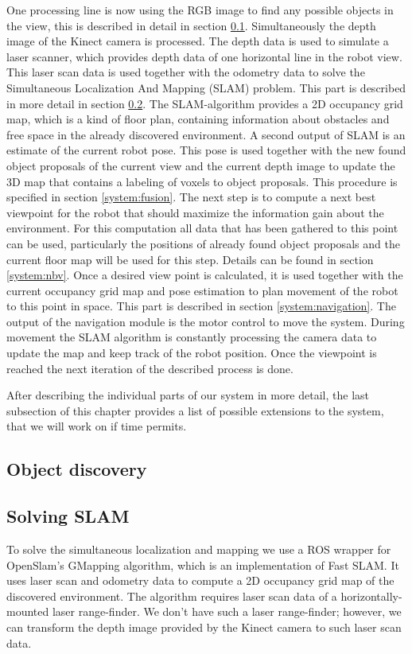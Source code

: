 \documentclass[a4paper,11pt,english]{article}
\begin{document}
One processing line is now using the RGB image to find any possible objects in the view, this is described in detail in section \ref{system:obj_discovery}.
Simultaneously the depth image of the Kinect camera is processed.
The depth data is used to simulate a laser scanner, which provides depth data of one horizontal line in the robot view. 
This laser scan data is used together with the odometry data to solve the Simultaneous Localization And Mapping (SLAM) problem. This part is described in more detail in section \ref{system:slam}.
The SLAM-algorithm provides a 2D occupancy grid map, which is a kind of floor plan, containing information about obstacles and free space in the already discovered environment. A second output of SLAM is an estimate of the current robot pose.
This pose is used together with the new found object proposals of the current view and the current depth image to update the 3D map that contains a labeling of voxels to object proposals. This procedure is specified in section \ref{system:fusion}. 
The next step is to compute a next best viewpoint for the robot that should maximize the information gain about the environment.
For this computation all data that has been gathered to this point can be used, particularly the positions of already found object proposals and the current floor map will be used for this step. Details can be found in section \ref{system:nbv}.
Once a desired view point is calculated, it is used together with the current occupancy grid map and pose estimation to plan movement of the robot to this point in space.
This part is described in section \ref{system:navigation}.
The output of the navigation module is the motor control to move the system.
During movement the SLAM algorithm is constantly processing the camera data to update the map and keep track of the robot position.
Once the viewpoint is reached the next iteration of the described process is done.

After describing the individual parts of our system in more detail, the last subsection of this chapter provides a list of possible extensions to the system, that we will work on if time permits.
\subsection{Object discovery}
\label{system:obj_discovery}

\subsection{Solving SLAM}
\label{system:slam}
To solve the simultaneous localization and mapping we use a ROS wrapper for OpenSlam's GMapping algorithm, which is an implementation of Fast SLAM.
It uses laser scan and odometry data to compute a 2D occupancy grid map of the discovered environment.
The algorithm requires laser scan data of a horizontally-mounted laser range-finder.
We don't have such a laser range-finder; however, we can transform the depth image provided by the Kinect camera to such laser scan data.
\end{document}
